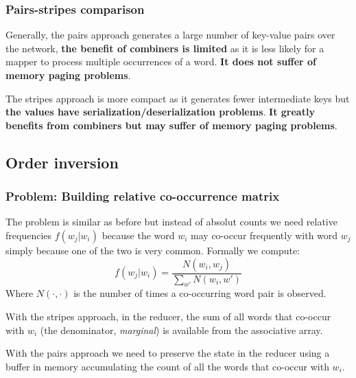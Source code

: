 \subsubsection{Pairs-stripes comparison}
Generally, the pairs approach generates a large number of key-value pairs over the network, \textbf{the benefit of combiners is limited} as it is less likely for a mapper to process multiple occurrences of a word. \textbf{It does not suffer of memory paging problems}.
\par\noindent
The stripes approach is more compact as it generates fewer intermediate keys but \textbf{the values have serialization/deserialization problems}. \textbf{It greatly benefits from combiners but may suffer of memory paging problems}.
\subsection{Order inversion}
\subsubsection{Problem: Building relative co-occurrence matrix}
The problem is similar as before but instead of absolut counts we need relative frequencies $f(w_j|w_i)$ because the word $w_i$ may co-occur frequently with word $w_j$ simply because one of the two is very common. Formally we compute:
\begin{equation*}
	f(w_j|w_i) = \dfrac{N(w_i, w_j)}{\sum_{w'}N(w_i, w')}
\end{equation*}
Where $N(\cdot,\cdot)$ is the number of times a co-occurring word pair is observed.
\newline
\par\noindent
With the stripes approach, in the reducer, the sum of all words that co-occur with $w_i$ (the denominator, \textit{marginal}) is available from the associative array.
\par
With the pairs approach we need to preserve the state in the reducer using a buffer in memory accumulating the count of all the words that co-occur with $w_i$.
